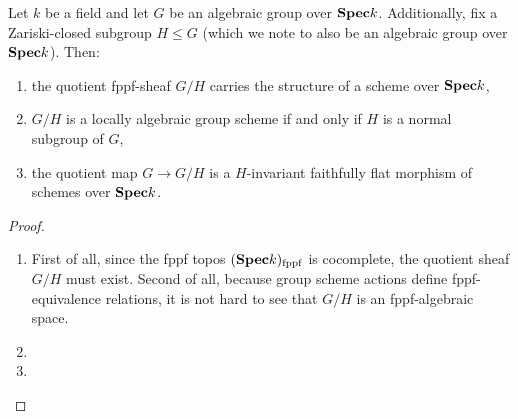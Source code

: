                     \begin{proposition} \label{prop: quotients_by_algebraic_groups}
                        Let $k$ be a field and let $G$ be an algebraic group over $\mathbf{Spec} k$. Additionally, fix a Zariski-closed subgroup $H \leq G$ (which we note to also be an algebraic group over $\mathbf{Spec} k$). Then:
                            \begin{enumerate}
                                \item the quotient fppf-sheaf $G/H$ carries the structure of a scheme over $\mathbf{Spec} k$,
                                \item $G/H$ is a locally algebraic group scheme if and only if $H$ is a normal subgroup of $G$,
                                \item the quotient map $G \to G/H$ is a $H$-invariant faithfully flat morphism of schemes over $\mathbf{Spec} k$.
                            \end{enumerate}
                    \end{proposition}
                        \begin{proof}
                            \noindent
                            \begin{enumerate}
                                \item First of all, since the fppf topos $(\mathbf{Spec} k)_{\mathrm{fppf}}$ is cocomplete, the quotient sheaf $G/H$ must exist. Second of all, because group scheme actions define fppf-equivalence relations, it is not hard to see that $G/H$ is an fppf-algebraic space. 
                                \item 
                                \item 
                            \end{enumerate}
                        \end{proof}
                    
